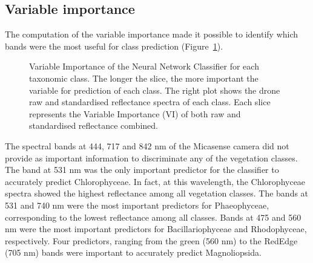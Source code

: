 \documentclass[
  number]{elsarticle}
\begin{document}
\subsection{Variable importance}\label{variable-importance-1}

The computation of the variable importance made it possible to identify
which bands were the most useful for class prediction
(Figure~\ref{fig-VIP}).

\label{cell-fig-VIP}
\begin{figure}[H]


\caption{\label{fig-VIP}Variable Importance of the Neural Network
Classifier for each taxonomic class. The longer the slice, the more
important the variable for prediction of each class. The right plot
shows the drone raw and standardised reflectance spectra of each class.
Each slice represents the Variable Importance (VI) of both raw and
standardised reflectance combined.}

\end{figure}%

The spectral bands at 444, 717 and 842 nm of the Micasense camera did
not provide as important information to discriminate any of the
vegetation classes. The band at 531 nm was the only important predictor
for the classifier to accurately predict Chlorophyceae. In fact, at this
wavelength, the Chlorophyceae spectra showed the highest reflectance
among all vegetation classes. The bands at 531 and 740 nm were the most
important predictors for Phaeophyceae, corresponding to the lowest
reflectance among all classes. Bands at 475 and 560 nm were the most
important predictors for Bacillariophyceae and Rhodophyceae,
respectively. Four predictors, ranging from the green (560 nm) to the
RedEdge (705 nm) bands were important to accurately predict
Magnoliopsida.
\end{document}
